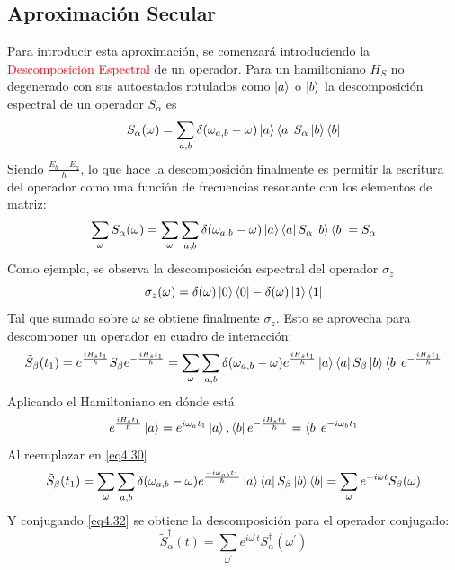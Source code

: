 \documentclass{book}
\begin{document}
\subsection{Aproximación Secular}
Para introducir esta aproximación, se comenzará introduciendo la \textcolor{red}{Descomposición Espectral} de un operador. Para un hamiltoniano $H_S$ no degenerado con sus autoestados rotulados como $\ket{a}$ o $\ket{b}$ la descomposición espectral de un operador $S_\alpha$ es
\begin{equation}\label{eq4.27}S_\alpha(\omega)=\sum_{a,b}\delta(\omega_{a,b}-\omega)\ket{a}\bra{a}S_\alpha\ket{b}\bra{b}\end{equation}
Siendo $\frac{E_b-E_a}{\hbar}$, lo que hace la descomposición finalmente es permitir la escritura del operador como una función de frecuencias resonante con los elementos de matriz:
\begin{equation}\label{eq4.28}\sum_\omega S_\alpha(\omega)=\sum_\omega\sum_{a,b}\delta(\omega_{a,b}-\omega)\ket{a}\bra{a}S_\alpha\ket{b}\bra{b}=S_\alpha\end{equation}
Como ejemplo, se observa la descomposición espectral del operador $\sigma_z$
\begin{equation}\label{eq4.29}\sigma_z(\omega)=\delta(\omega)\ket{0}\bra{0}-\delta(\omega)\ket{1}\bra{1}\end{equation}
Tal que sumado sobre $\omega$ se obtiene finalmente $\sigma_z$.
Esto se aprovecha para descomponer un operador en cuadro de interacción:
\begin{equation}\label{eq4.30}\tilde{S}_\beta(t_1)=e^{\frac{iH_s t_1}{\hbar}}S_\beta e^{-\frac{iH_s t_1}{\hbar}}=\sum_\omega\sum_{a,b}\delta(\omega_{a,b}-\omega)e^{\frac{iH_s t_1}{\hbar}}\ket{a}\bra{a}S_\beta\ket{b}\bra{b}e^{-\frac{iH_s t_1}{\hbar}}\end{equation}
Aplicando el Hamiltoniano en dónde está 
\begin{equation}\label{eq4.31}e^{\frac{iH_s t_1}{\hbar}}\ket{a}=e^{i\omega_a t_1}\ket{a},\bra{b}e^{-\frac{iH_s t_1}{\hbar}}=\bra{b}e^{-i\omega_b t_1}\end{equation}
Al reemplazar en \ref{eq4.30}
\begin{equation}\label{eq4.32}\tilde{S}_\beta(t_1)=\sum_\omega\sum_{a,b}\delta(\omega_{a,b}-\omega)e^{\frac{-i\omega_{ab}t_1}{\hslash}}\ket{a}\bra{a}S_\beta\ket{b}\bra{b}=\sum_\omega e^{-i\omega t}S_\beta(\omega)\end{equation}
Y conjugando \ref{eq4.32} se obtiene la descomposición para el operador conjugado:
\begin{equation}\label{eq4.33}\tilde{S}_\alpha^\dag (t)=\sum_{\omega^\prime}e^{i\omega^\prime t}S_\alpha^\dag(\omega^\prime)\end{equation}
\end{document}
